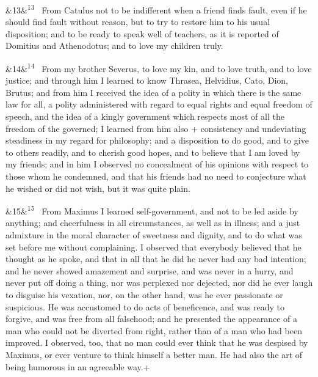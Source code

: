 \documentclass[12pt]{article}
\newcommand{\para}[1][]{\par\noindent\ifx&#1&\else\textsuperscript{\footnotesize #1}~\fi}
\begin{document}
\para[13] From Catulus not to be indifferent when a friend finds fault,
even if he should find fault without reason, but to try to restore him
to his usual disposition; and to be ready to speak well of teachers, as
it is reported of Domitius and Athenodotus; and to love my children
truly.

\para[14] From my brother Severus, to love my kin, and to love truth, and
to love justice; and through him I learned to know Thrasea, Helvidius,
Cato, Dion, Brutus; and from him I received the idea of a polity in
which there is the same law for all, a polity administered with regard
to equal rights and equal freedom of speech, and the idea of a kingly
government which respects most of all the freedom of the governed; I
learned from him also + consistency and undeviating steadiness in my
regard for philosophy; and a disposition to do good, and to give to
others readily, and to cherish good hopes, and to believe that I am
loved by my friends; and in him I observed no concealment of his
opinions with respect to those whom he condemned, and that his friends
had no need to conjecture what he wished or did not wish, but it was
quite plain.

\para[15] From Maximus I learned self-government, and not to be led aside
by anything; and cheerfulness in all circumstances, as well as in
illness; and a just admixture in the moral character of sweetness and
dignity, and to do what was set before me without complaining. I
observed that everybody believed that he thought as he spoke, and that
in all that he did he never had any bad intention; and he never showed
amazement and surprise, and was never in a hurry, and never put off
doing a thing, nor was perplexed nor dejected, nor did he ever laugh to
disguise his vexation, nor, on the other hand, was he ever passionate or
suspicious. He was accustomed to do acts of beneficence, and was ready
to forgive, and was free from all falsehood; and he presented the
appearance of a man who could not be diverted from right, rather than of
a man who had been improved. I observed, too, that no man could ever
think that he was despised by Maximus, or ever venture to think himself
a better man. He had also the art of being humorous in an agreeable
way.+
\end{document}
